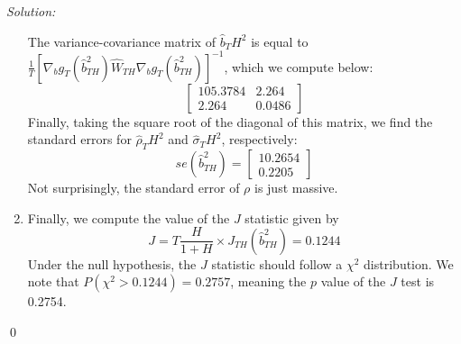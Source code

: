 \documentclass[12pt]{article}
\newenvironment{problem}[2][Problem]{\begin{trivlist}
\item[\hskip \labelsep {\bfseries #1}\hskip \labelsep {\bfseries #2.}]}{\end{trivlist}}
\newenvironment{sol}
    {\emph{Solution:}
    }
    {
    \qed
    }
\begin{document}
\begin{sol}
\begin{enumerate}[label=\alph*) ]
        The variance-covariance matrix of $\hat{b}_TH^2$ is equal to $\frac{1}{T}[\nabla_b g_T(\hat{b}_{TH}^2) \hat{W}_{TH} \nabla_b g_T(\hat{b}_{TH}^2)]^{-1}$, which we compute below:
        \[\begin{bmatrix}105.3784 & 2.264\\ 2.264& 0.0486 \end{bmatrix}\]
        Finally, taking the square root of the diagonal of this matrix, we find the standard errors for $\hat{\rho}_TH^2$ and $\hat{\sigma}_TH^2$, respectively:
        \[se(\hat{b}_{TH}^2) = \begin{bmatrix} 10.2654\\ 0.2205\end{bmatrix}\]
        Not surprisingly, the standard error of $\rho$ is just massive. 
        \item Finally, we compute the value of the $J$ statistic given by
        \[J = T \frac{H}{1 + H}\times J_{TH}(\hat{b}_{TH}^2) = 0.1244\]
        Under the null hypothesis, the $J$ statistic should follow a $\chi^2$ distribution. We note that $P(\chi^2 > 0.1244) = 0.2757$, meaning the $p$ value of the $J$ test is 0.2754. 
    \end{enumerate}
\end{sol}
\begin{problem}{5}
\end{problem}
\end{document}
